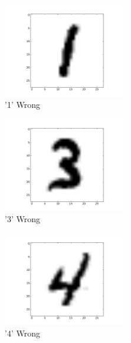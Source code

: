 \documentclass[10pt,psamsfonts]{amsart}
\theoremstyle{definition}
\theoremstyle{remark}
\numberwithin{equation}{section}
\begin{document}
\begin{figure}[b]
	\centering
	\begin{subfigure}[b]{0.25\textwidth}
		\centering
		\includegraphics[width=0.6\textwidth]{hw2_4-1_1v7_ex.pdf}
		\caption{'1' Wrong}
	\end{subfigure}
	\begin{subfigure}[b]{0.25\textwidth}
		\centering
		\includegraphics[width=0.6\textwidth]{hw2_4-1_3v5_ex.pdf}
		\caption{'3' Wrong}
	\end{subfigure}
	\begin{subfigure}[b]{0.25\textwidth}
		\centering
		\includegraphics[width=0.6\textwidth]{hw2_4-1_4v9_ex.pdf}
		\caption{'4' Wrong}
	\end{subfigure}
	\begin{subfigure}[b]{0.25\textwidth}

\end{subfigure}
\end{figure}
\end{document}

